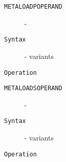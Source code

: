 \clearpage
\begin{description}
\item[\texttt{METALOADPOPERAND}]  - \\
\item[\texttt{Syntax}] - variants\\

\item[\texttt{Operation}]
\item[\texttt{}]
\end{description}
\clearpage
\begin{description}
\item[\texttt{METALOADSOPERAND}]  - \\
\item[\texttt{Syntax}] - variants\\

\item[\texttt{Operation}]
\item[\texttt{}]
\end{description}
\clearpage
